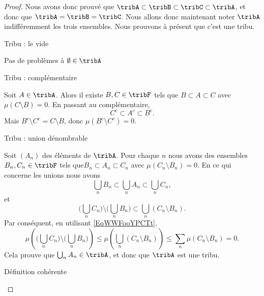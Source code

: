 \begin{proof}
    Nous avons donc prouvé que \( \tribA\subset\tribB\subset\tribC\subset \tribA\), et donc que \( \tribA=\tribB=\tribC\). Nous allons donc maintenant noter \( \tribA\) indifféremment les trois ensembles. Nous prouvons à présent que c'est une tribu.

    \begin{subproof}

        \item[Tribu : le vide]

            Pas de problèmes à \( \emptyset\in\tribA\)

        \item[Tribu : complémentaire]

            Soit \( A\in\tribA\). Alors il existe \( B,C\in\tribF\) tels que \( B\subset A\subset C\) avec \( \mu(C\setminus B)=0\). En passant au complémentaire,
            \begin{equation}
                C^c\subset A^c\subset B^c.
            \end{equation}
            Mais \( B^c\setminus C^c=C\setminus B\), donc \( \mu(B^c\setminus C^c)=0\).

        \item[Tribu : union dénombrable]

            Soit \( (A_n)\) des éléments de \( \tribA\). Pour chaque \( n\) nous avons des ensembles \( B_n,C_n\in\tribF\) tels que\( B_n\subset A_n\subset C_n\) avec \( \mu(C_n\setminus B_n)=0\). En ce qui concerne les unions nous avons
            \begin{equation}
                \bigcup_nB_n\subset \bigcup_nA_n\subset \bigcup_nC_n,
            \end{equation}
            et
            \begin{equation}
                \big( \bigcup_nC_n\big)\setminus\big( \bigcup_nB_n\big)\subset \bigcup_n(C_n\setminus B_n).
            \end{equation}
            Par conséquent, en utilisant \eqref{EqWWFooYPCTt},
            \begin{equation}
                \mu\left( \big( \bigcup_nC_n\big)\setminus\big( \bigcup_nB_n\big)\right)\leq\mu\left(  \bigcup_n(C_n\setminus B_n)\right)\leq\sum_n\mu(C_n\setminus B_n)=0.
            \end{equation}
            Cela prouve que \( \bigcup_nA_n\in\tribA\), et donc que \( \tribA\) est une tribu.

        \item[Définition cohérente]


\end{subproof}
\end{proof}
